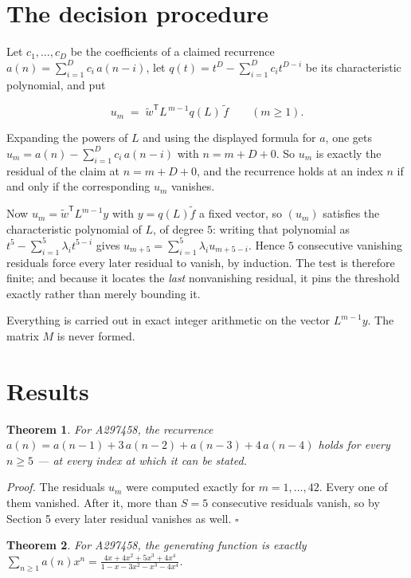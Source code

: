 \documentclass[11pt]{article}
\newtheorem{theorem}{Theorem}
\theoremstyle{definition}
\begin{document}
\section{The decision procedure}

Let $c_1,\dots,c_D$ be the coefficients of a claimed recurrence $a(n) = \sum_{i=1}^{D} c_i\,a(n-i)$, let $q(t) = t^{D} - \sum_{i=1}^{D} c_i t^{D-i}$ be its characteristic polynomial, and put

\[u_m \;=\; \tilde w^{\mathsf T} L^{\,m-1} q(L)\,\tilde f \qquad (m \ge 1).\]

Expanding the powers of $L$ and using the displayed formula for $a$, one gets $u_m = a(n) - \sum_{i=1}^{D} c_i\,a(n-i)$ with $n = m + D + 0$. So $u_m$ is exactly the residual of the claim at $n = m + D + 0$, and the recurrence holds at an index $n$ if and only if the corresponding $u_m$ vanishes.

Now $u_m = \tilde w^{\mathsf T} L^{m-1} y$ with $y = q(L)\tilde f$ a fixed vector, so $(u_m)$ satisfies the characteristic polynomial of $L$, of degree $5$: writing that polynomial as $t^{5} - \sum_{i=1}^{5} \lambda_i t^{5-i}$ gives $u_{m+5} = \sum_{i=1}^{5} \lambda_i u_{m+5-i}$. Hence $5$ consecutive vanishing residuals force every later residual to vanish, by induction. The test is therefore finite; and because it locates the {\itshape last} nonvanishing residual, it pins the threshold exactly rather than merely bounding it.

Everything is carried out in exact integer arithmetic on the vector $L^{m-1}y$. The matrix $M$ is never formed.

\section{Results}

\begin{theorem} For A297458, the recurrence $a(n) = a(n-1) + 3\,a(n-2) + a(n-3) + 4\,a(n-4)$ holds for every $n \ge 5$ --- at every index at which it can be stated.\end{theorem}

{\itshape Proof.} The residuals $u_m$ were computed exactly for $m = 1,\dots,42$. Every one of them vanished. After it, more than $S = 5$ consecutive residuals vanish, so by Section 5 every later residual vanishes as well. $\square$

\begin{theorem} For A297458, the generating function is exactly $\sum_{n\ge 1} a(n)x^n = \frac{4x + 4x^{2} + 5x^{3} + 4x^{4}}{1 - x - 3x^{2} - x^{3} - 4x^{4}}$.\end{theorem}
\end{document}
